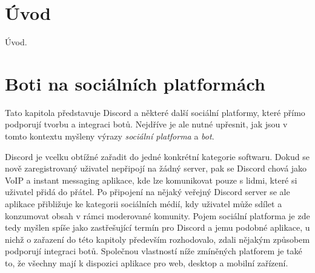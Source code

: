 \documentclass[FM]{tulthesis}
\begin{document}
	
	
	\chapter{Úvod}
	
	
	
	Úvod.
	
	\chapter{Boti na sociálních platformách}\label{Chapter2}
	
	Tato kapitola představuje Discord a některé další sociální platformy, které přímo podporují tvorbu a integraci botů. Nejdříve je ale nutné upřesnit, jak jsou v tomto kontextu myšleny výrazy \textit{sociální platforma} a \textit{bot}.
	
	Discord je vcelku obtížné zařadit do jedné konkrétní kategorie softwaru. Dokud se nově zaregistrovaný uživatel nepřipojí na žádný server, pak se Discord chová jako VoIP a instant messaging aplikace, kde lze komunikovat pouze s lidmi, které si uživatel přidá do přátel. Po připojení na nějaký veřejný Discord server se ale aplikace přibližuje ke kategorii sociálních médií, kdy uživatel může sdílet a konzumovat obsah v rámci moderované komunity. Pojem sociální platforma je zde tedy myšlen spíše jako zastřešující termín pro Discord a jemu podobné aplikace, u nichž o zařazení do této kapitoly především rozhodovalo, zdali nějakým způsobem podporují integraci botů. Společnou vlastností níže zmíněných platforem je také to, že všechny mají k dispozici aplikace pro web, desktop a mobilní zařízení.
	
\end{document}
